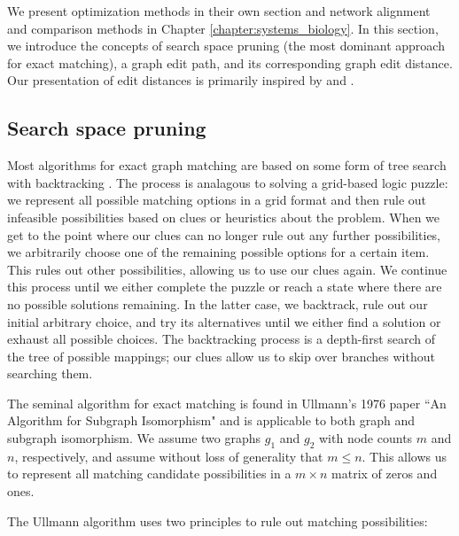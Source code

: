 \documentclass[12pt]{thesis}
\theoremstyle{plain}
\theoremstyle{definition}
\theoremstyle{remark}
\begin{document}
We present optimization methods in their own section and network alignment and comparison methods in Chapter \ref{chapter:systems_biology}. In this section, we introduce the concepts of search space pruning (the most dominant approach for exact matching), a graph edit path, and its corresponding graph edit distance. Our presentation of edit distances is primarily inspired by \cite{Livi_2012} and \cite{Riesen_2009}.

\subsection{Search space pruning}

Most algorithms for exact graph matching are based on some form of tree search with backtracking \cite{Conte_2004}. The process is analagous to solving a grid-based logic puzzle: we represent all possible matching options in a grid format and then rule out infeasible possibilities based on clues or heuristics about the problem. When we get to the point where our clues can no longer rule out any further possibilities, we arbitrarily choose one of the remaining possible options for a certain item. This rules out other possibilities, allowing us to use our clues again. We continue this process until we either complete the puzzle or reach a state where there are no possible solutions remaining. In the latter case, we backtrack, rule out our initial arbitrary choice, and try its alternatives until we either find a solution or exhaust all possible choices. The backtracking process is a depth-first search of the tree of possible mappings; our clues allow us to skip over branches without searching them.

The seminal algorithm for exact matching is found in Ullmann's 1976 paper ``An Algorithm for Subgraph Isomorphism" \cite{Ullmann_1976} and is applicable to both graph and subgraph isomorphism. We assume two graphs $g_1$ and $g_2$ with node counts $m$ and $n$, respectively, and assume without loss of generality that $m\leq n$. This allows us to represent all matching candidate possibilities in a $m\times n$ matrix of zeros and ones.

\newpage

The Ullmann algorithm uses two principles to rule out matching possibilities:
\end{document}
